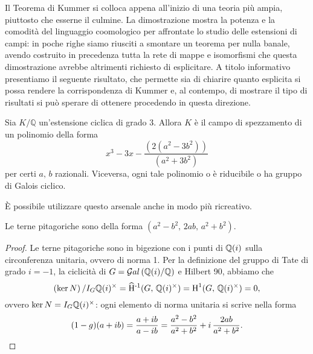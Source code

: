 Il Teorema di Kummer si colloca appena all'inizio di una teoria più ampia, piuttosto che esserne il culmine. La dimostrazione mostra la potenza e la comodità del linguaggio coomologico per affrontate lo studio delle estensioni di campi: in poche righe siamo riusciti a smontare un teorema per nulla banale, avendo costruito in precedenza tutta la rete di mappe e isomorfismi che questa dimostrazione avrebbe altrimenti richiesto di esplicitare. A titolo informativo presentiamo il seguente risultato, che permette sia di chiarire quanto esplicita si possa rendere la corrispondenza di Kummer e, al contempo, di mostrare il tipo di risultati si può sperare di ottenere procedendo in questa direzione.

\begin{proposition}
	Sia $K/\mathbb{Q}$ un'estensione ciclica di grado 3. Allora $ K $ è il campo di spezzamento di un polinomio della forma $$ x^3-3x-\frac{(2(a^2-3b^2))}{(a^2+3b^2)} $$ per certi $ a,\, b $ razionali. Viceversa, ogni tale polinomio o è riducibile o ha gruppo di Galois ciclico.
\end{proposition} 

È possibile utilizzare questo arsenale anche in modo più ricreativo.

\begin{theorem}
	Le terne pitagoriche sono della forma $ (a^2-b^2,\, 2ab,\, a^2+b^2) $.
\end{theorem}

\begin{proof}
	Le terne pitagoriche sono in bigezione con i punti di $ \mathbb{Q}(i) $ sulla circonferenza unitaria, ovvero di norma 1. Per la definizione del gruppo di Tate di grado $ i = -1 $, la ciclicità di $ G = \mathcal{G}al\left( \mathbb{Q}(i)/\mathbb{Q} \right) $ e Hilbert 90, abbiamo che
	\[  \left(\ker N\right) / I_G \mathbb{Q}(i)^\times = \operatorname{\widehat{H}^{-1}}(G, \, \mathbb{Q}(i)^\times) = \operatorname{H}^1(G, \, \mathbb{Q}(i)^\times) = 0, \]
	ovvero $ \ker N = I_G \mathbb{Q}(i)^\times $: ogni elemento di norma unitaria si scrive nella forma
	\[ (1-g) (a+ib) = \frac{a+ib}{a-ib} = \frac{a^2 -b^2}{a^2 + b^2} + i \, \frac{2ab}{a^2 + b^2}. \qedhere \]
\end{proof}

